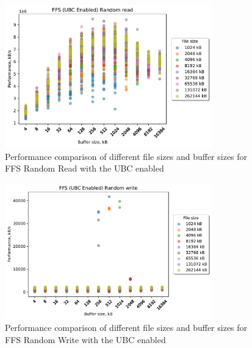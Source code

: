 \begin{figure}[!htb]
	\label{fig:bench_ffs_ubc_scatter_rnd_read}
	\begin{center}
		\includegraphics[width=0.8\textwidth]{figures.nosync/benchmarking/FFS/scatter-UBC Enabled-Random read.pdf}
	\end{center}
	\caption[Comparison of Random Read performance for file size and buffer size for FFS with the UBC enabled]{Performance comparison of different file sizes and buffer sizes for FFS Random Read with the UBC enabled}
\end{figure}
\begin{figure}[!htb]
	\label{fig:bench_ffs_ubc_scatter_rnd_write}
	\begin{center}
		\includegraphics[width=0.8\textwidth]{figures.nosync/benchmarking/FFS/scatter-UBC Enabled-Random write.pdf}
	\end{center}
	\caption[Comparison of Random Write performance for file size and buffer size for FFS with the UBC enabled]{Performance comparison of different file sizes and buffer sizes for FFS Random Write with the UBC enabled}
\end{figure}
\clearpage



